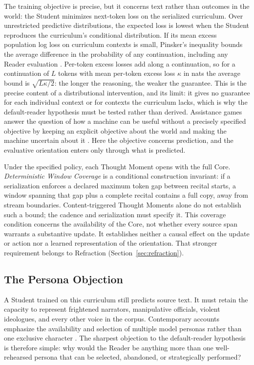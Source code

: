 \documentclass[11pt]{article}
\begin{document}
The training objective is precise, but it concerns text rather than outcomes in
the world: the Student minimizes next-token loss on the serialized curriculum.
Over unrestricted predictive distributions, the expected loss is lowest when the
Student reproduces the curriculum's conditional distribution. If its mean excess
population log loss on curriculum contexts is small, Pinsker's inequality bounds
the average difference in the probability of any continuation, including any
Reader evaluation \cite{cover2006elements}. Per-token excess losses add along a continuation, so
for a continuation of $L$ tokens with mean per-token excess loss $\kappa$ in nats
the average bound is $\sqrt{L\kappa/2}$: the longer the reasoning, the weaker the
guarantee. This is the precise content of a distributional
intervention, and its limit: it gives no guarantee for each individual context or for contexts the
curriculum lacks, which is why the default-reader hypothesis must be tested rather than
derived. Assistance games answer the question of how a machine can be useful
without a precisely specified objective by keeping an explicit objective about
the world and making the machine uncertain about it
\cite{hadfieldmenell2016cirl}. Here the objective concerns prediction, and the
evaluative orientation enters only through what is predicted.

Under the specified policy, each Thought Moment opens with the full Core.
\emph{Deterministic Window Coverage} is a conditional construction invariant:
if a serialization enforces a declared maximum token gap between recital
starts, a window spanning that gap plus a complete recital contains a full
copy, away from stream boundaries. Content-triggered Thought Moments alone do
not establish such a bound; the cadence and serialization must specify it.
This coverage condition concerns the availability of the Core, not whether
every source span warrants a substantive update. It establishes neither a
causal effect on the update or action nor a learned representation of the
orientation. That stronger requirement belongs to Refraction
(Section~\ref{sec:refraction}).

\subsection{The Persona Objection}\label{sec:persona-objection}

A Student trained on this curriculum still predicts source text. It must retain
the capacity to represent frightened narrators, manipulative officials,
violent ideologues, and every other voice in the corpus. Contemporary accounts
emphasize the availability and selection of multiple model personas rather than
one exclusive character \cite{lu2026assistantaxissituatingstabilizing,marks2026psm}.
The sharpest objection to the default-reader hypothesis is therefore simple: why would the Reader be
anything more than one well-rehearsed persona that can be selected, abandoned,
or strategically performed?
\end{document}
